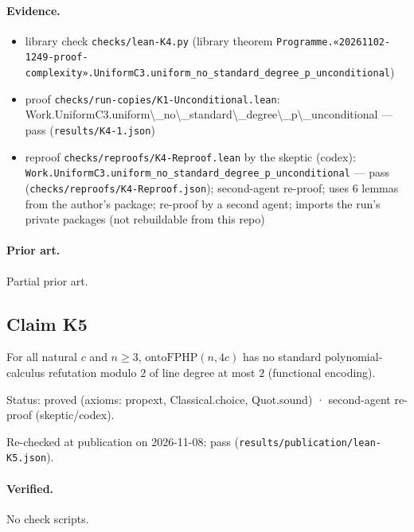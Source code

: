 \documentclass{article}
\begin{document}
\paragraph{Evidence.}
\begin{itemize}
\item library check \texttt{checks/lean-K4.py} (library theorem \texttt{Programme.«20261102-1249-proof-complexity».UniformC3.uniform\_no\_standard\_degree\_p\_unconditional})
\item proof \texttt{checks/run-copies/K1-Unconditional.lean}: Work.UniformC3.uniform\textbackslash{}\_no\textbackslash{}\_standard\textbackslash{}\_degree\textbackslash{}\_p\textbackslash{}\_unconditional --- pass (\texttt{results/K4-1.json})
\item reproof \texttt{checks/reproofs/K4-Reproof.lean} by the skeptic (codex): \texttt{Work.UniformC3.uniform\_no\_standard\_degree\_p\_unconditional} --- pass (\texttt{checks/reproofs/K4-Reproof.json}); second-agent re-proof; uses 6 lemmas from the author's package; re-proof by a second agent; imports the run's private packages (not rebuildable from this repo)
\end{itemize}

\paragraph{Prior art.} Partial prior art.

\subsection*{Claim K5}

For all natural $c$ and $n\ge3$, $\mathrm{ontoFPHP}(n,4c)$ has no standard polynomial-calculus refutation modulo $2$ of line degree at most $2$ (functional encoding).

Status: proved (axioms: propext, Classical.choice, Quot.sound) · second-agent re-proof (skeptic/codex).

Re-checked at publication on 2026-11-08: pass (\texttt{results/publication/lean-K5.json}).

\paragraph{Verified.}
No check scripts.
\end{document}
